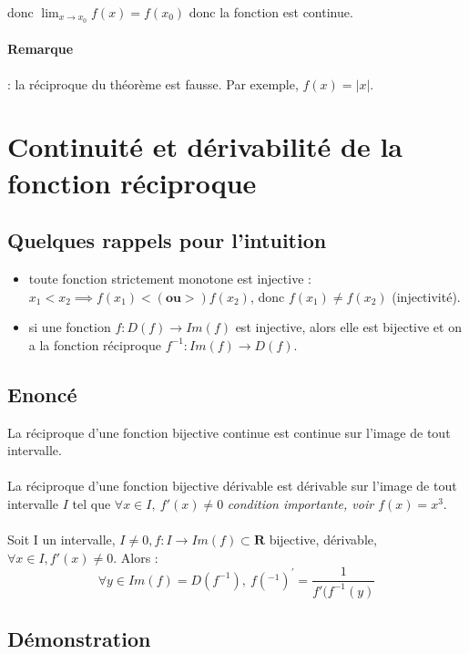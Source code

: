 \documentclass{article}
\begin{document}
donc $ \lim_{x\to{x_0}} f(x) = f(x_0) $ donc la fonction est continue.
\paragraph{Remarque}: la réciproque du théorème est fausse. Par exemple, $ f(x) = |x| $.

\newpage

\section{Continuité et dérivabilité de la fonction réciproque}

\subsection{Quelques rappels pour l'intuition}


\begin{itemize}
    \item toute fonction strictement monotone est injective :\\
$ x_1 < x_2 \implies f(x_1) < (\textbf{ou} >) f(x_2) $, donc $ f(x_1) \neq f(x_2) $ (injectivité).
    \item si une fonction $ f: D(f) \to Im(f) $ est injective, alors elle est bijective et on a la fonction réciproque $ f^{-1} : Im(f) \to D(f) $.
\end{itemize}

\subsection{Enoncé}

La réciproque d'une fonction bijective continue est continue sur l'image de tout intervalle.\\\\
La réciproque d'une fonction bijective dérivable est dérivable sur l'image de tout intervalle $ I $ tel que $ \forall x \in I,\ f'(x) \neq 0 $ \textit{condition importante, voir $ f(x) = x^3 $}.\\\\
Soit I un intervalle, $ I \neq 0, f : I \to Im(f) \subset \mathbf{R} $ bijective, dérivable, $ \forall x \in I, f'(x) \neq 0 $. Alors :
\[ \forall y \in Im(f) = D(f^{-1}),\ f(^{-1})^{'} = \frac{1}{f'(f^{-1}(y)} \]

\subsection{Démonstration}
\end{document}
